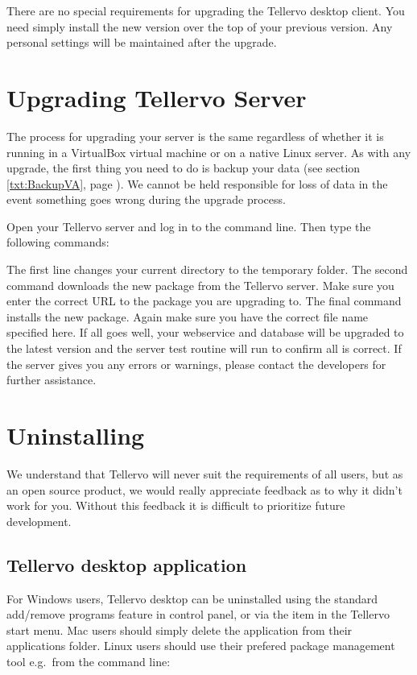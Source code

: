 There are no special requirements for upgrading the Tellervo desktop client.  You need simply install the new version over the top of your previous version.  Any personal settings will be maintained after the upgrade.


\section{Upgrading Tellervo Server}

The process for upgrading your server is the same regardless of whether it is running in a VirtualBox virtual machine or on a native Linux server.  As with any upgrade, the first thing you need to do is backup your data (see section \ref{txt:BackupVA}, page \pageref{txt:BackupVA}).  We cannot be held responsible for loss of data in the event something goes wrong during the upgrade process.  

Open your Tellervo server and log in to the command line.  Then type the following commands:


The first line changes your current directory to the temporary folder.  The second command downloads the new package from the Tellervo server.  Make sure you enter the correct URL to the package you are upgrading to.  The final command installs the new package.  Again make sure you have the correct file name specified here. If all goes well, your webservice and database will be upgraded to the latest version and the server test routine will run to confirm all is correct.  If the server gives you any errors or warnings, please contact the developers for further assistance.

\section{Uninstalling}

We understand that Tellervo will never suit the requirements of all users, but as an open source product, we would really appreciate feedback as to why it didn't work for you.  Without this feedback it is difficult to prioritize future development.

\subsection{Tellervo desktop application}
For Windows users, Tellervo desktop can be uninstalled using the standard add/remove programs feature in control panel, or via the item in the Tellervo start menu.  Mac users should simply delete the application from their applications folder.  Linux users should use their prefered package management tool e.g.\ from the command line:

